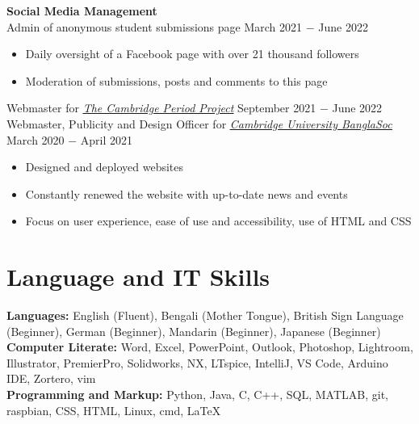 \documentclass{article}
\begin{document}
\textbf{Social Media Management}\\
Admin of anonymous student submissions page \hfill March 2021 $-$ June 2022
\begin{itemize}
    \item Daily oversight of a Facebook page with over 21 thousand followers
    \item Moderation of submissions, posts and comments to this page
\end{itemize}
Webmaster for \href{http://tcpp.soc.srcf.net/}{\underline{\textit{The Cambridge Period Project}}} \hfill September 2021 $-$ June 2022\\ 
Webmaster, Publicity and Design Officer for \href{https://cambridgebanglasoc.org/}{\underline{\textit{Cambridge University BanglaSoc}}} \hfill March 2020 $-$ April 2021
\begin{itemize}
    \item Designed and deployed websites
    \item Constantly renewed the website with up-to-date news and events 
    \item Focus on user experience, ease of use and accessibility, use of HTML and CSS
\end{itemize} \medskip

\vspace{-.75\baselineskip}
\hrulefill
\vspace{-.75\baselineskip}

\section*{Language and IT Skills}
\textbf{Languages:} English (Fluent), Bengali (Mother Tongue), 
British Sign Language (Beginner), 
German (Beginner), 
Mandarin (Beginner), 
Japanese (Beginner) \\
\textbf{Computer Literate:}
Word, Excel, PowerPoint, Outlook, Photoshop, Lightroom, Illustrator, PremierPro, 
Solidworks, NX, LTspice, IntelliJ, VS Code, Arduino IDE, Zortero, vim\\
\textbf{Programming and Markup:} Python, Java, C, C++, SQL, MATLAB, git, raspbian, CSS, HTML, Linux, cmd, \LaTeX\medskip

\vspace{-.75\baselineskip}
\hrulefill
\vspace{-.75\baselineskip}
\end{document}
